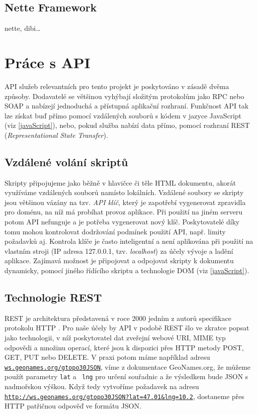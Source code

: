 \subsection{Nette Framework}
nette, dibi\ldots

\section{Práce s API}
API služeb relevantních pro tento projekt je poskytováno v zásadě
dvěma způsoby. Dodavatelé se většinou vyhýbají
složitým protokolům jako RPC nebo SOAP a nabízejí jednoduchá a
přístupná aplikační rozhraní. Funkčnost API tak lze získat buď přímo
pomocí vzdálených souborů s kódem v jazyce JavaScript (viz
\ref{javaScript}), nebo, pokud služba nabízí data přímo, pomocí
rozhraní REST ({\it Representational State Transfer}).

\subsection{Vzdálené volání skriptů}
Skripty připojujeme jako běžně v hlavičce či těle HTML
dokumentu, akorát využíváme vzdálených souborů namísto lokálních.
Vzdálené soubory se skripty jsou většinou vázány na tzv. {\it API
klíč}, který je zapotřebí vygenerovat zpravidla pro doménu, na níž má
probíhat provoz aplikace. Při použití na jiném serveru potom API
nefunguje a je potřeba vygenerovat nový klíč. Poskytovatelé díky tomu
mohou kontrolovat dodržování podmínek použití API, např. limity
požadavků aj. Kontrola klíče je často inteligentní a není aplikována
při použití na vlastním stroji (IP adresa 127.0.0.1, tzv. {\it
localhost}) za účely vývoje a ladění aplikace. Zajímavá možnost je
připojovat a odpojovat skripty k dokumentu dynamicky, pomocí jiného
řídícího skriptu a technologie DOM (viz \ref{javaScript}).

\subsection{Technologie REST}
REST je architektura představená v roce 2000 jedním z autorů
specifikace protokolu HTTP \cite{rest}. Pro naše účely by API v
podobě REST šlo ve zkratce popsat jako technologii, v níž poskytovatel dat zveřejní webové URI, MIME typ odpovědi a množinu operací, které jsou k dispozici přes HTTP metody POST, GET, PUT nebo DELETE. V praxi
potom máme například adresu {\tt \url{ws.geonames.org/gtopo30JSON}},
víme z dokumentace GeoNames.org, že můžeme použít parametry {\tt lat} a {\tt
lng} pro určení souřadnic a že výsledkem bude JSON s nadmořskou
výškou. Když tedy vytvoříme požadavek na adresu
{\tt \url{http://ws.geonames.org/gtopo30JSON?lat=47.01&lng=10.2}},
dostaneme přes HTTP patřičnou odpověď ve formátu JSON.

